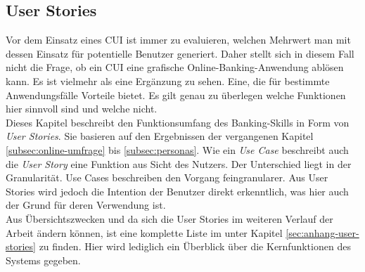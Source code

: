 \subsection{User Stories}
\label{subsec:user-stories}
Vor dem Einsatz eines \ac{CUI} ist immer zu evaluieren, welchen Mehrwert man mit dessen Einsatz für potentielle Benutzer generiert. Daher stellt sich in diesem Fall nicht die Frage, ob ein \ac{CUI} eine grafische Online-Banking-Anwendung ablösen kann. Es ist vielmehr als eine Ergänzung zu sehen. Eine, die für bestimmte Anwendungsfälle Vorteile bietet. Es gilt genau zu überlegen welche Funktionen hier sinnvoll sind und welche nicht.\\
Dieses Kapitel beschreibt den Funktionsumfang des Banking-Skills in Form von \textit{User Stories}. Sie basieren auf den Ergebnissen der vergangenen Kapitel \ref{subsec:online-umfrage} bis \ref{subsec:personas}. Wie ein \textit{Use Case} beschreibt auch die \textit{User Story} eine Funktion aus Sicht des Nutzers. Der Unterschied liegt in der Granularität. Use Cases beschreiben den Vorgang feingranularer. Aus User Stories wird jedoch die Intention der Benutzer direkt erkenntlich, was hier auch der Grund für deren Verwendung ist.\\
Aus Übersichtszwecken und da sich die User Stories im weiteren Verlauf der Arbeit ändern können, ist eine komplette Liste im  unter Kapitel \ref{sec:anhang-user-stories} zu finden. Hier wird lediglich ein Überblick über die Kernfunktionen des Systems gegeben.

